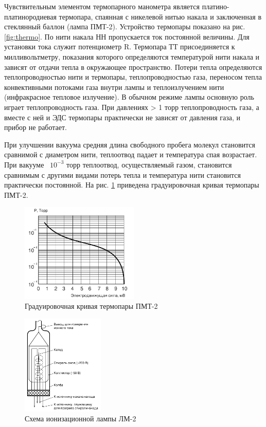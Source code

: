 \documentclass[a4paper,12pt]{article} %
\begin{document}
Чувствительным элементом термопарного манометра является платино-платинородиевая термопара, спаянная с никелевой нитью накала и заключенная в стеклянный баллон (лампа ПМТ-2). Устройство термопары показано на рис. \ref{fig:thermo}. По нити накала НН пропускается ток постоянной величины. Для установки тока служит потенциометр R. Термопара ТТ присоединяется к милливольтметру, показания которого определяются температурой нити накала и зависят от отдачи тепла в окружающее пространство. Потери тепла определяются теплопроводностью нити и термопары, теплопроводностью газа, переносом тепла конвективными потоками газа внутри лампы и теплоизлучением нити (инфракрасное тепловое излучение). В обычном режиме лампы основную роль играет теплопроводность газа. При давлениях > 1 торр теплопроводность газа, а вместе с ней и ЭДС термопары практически не зависят от давления газа, и прибор не работает.

При улучшении вакуума средняя длина свободного пробега молекул становится сравнимой с диаметром нити, теплоотвод падает и температура спая возрастает. При вакууме ~$10^{-3}$ торр теплоотвод, осуществляемый газом, становится сравнимым с другими видами потерь тепла и температура нити становится практически постоянной. На рис. \ref{fig:grad} приведена градуировочная кривая термопары ПМТ-2.

\begin{figure}
    \centering
    \includegraphics[width = 0.5\textwidth]{grad.PNG}
    \caption{Градуировочная кривая термопары ПМТ-2}
    \label{fig:grad}
\end{figure}

\begin{figure}
    \centering
    \includegraphics[width = 0.35\textwidth]{ion.PNG}
    \caption{Схема ионизационной лампы ЛМ-2}
    \label{fig:ion}
\end{figure}
\end{document}
